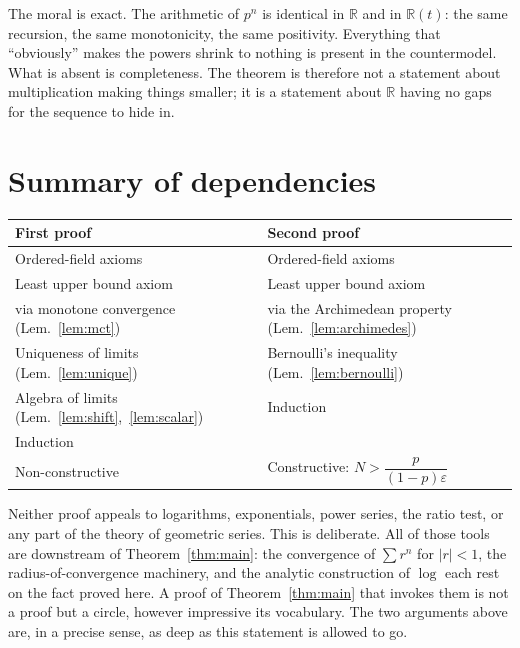 \documentclass{essay}
\begin{document}
The moral is exact. The arithmetic of \(p^{n}\) is identical in \(\mathbb{R}\) and in
\(\mathbb{R}(t)\): the same recursion, the same monotonicity, the same positivity.
Everything that ``obviously'' makes the powers shrink to nothing is present in the
countermodel. What is absent is completeness. The theorem is therefore not a
statement about multiplication making things smaller; it is a statement about
\(\mathbb{R}\) having no gaps for the sequence to hide in.

\section{Summary of dependencies}

\begin{center}
  \begin{tabular}{ll}
    \hline
    \textbf{First proof} & \textbf{Second proof} \\
    \hline
    Ordered-field axioms & Ordered-field axioms \\
    Least upper bound axiom & Least upper bound axiom \\
    \quad via monotone convergence (Lem.~\ref{lem:mct})
    & \quad via the Archimedean property (Lem.~\ref{lem:archimedes}) \\
    Uniqueness of limits (Lem.~\ref{lem:unique}) & Bernoulli's inequality
    (Lem.~\ref{lem:bernoulli}) \\
    Algebra of limits (Lem.~\ref{lem:shift},~\ref{lem:scalar}) & Induction \\
    Induction & \\
    \hline
    Non-constructive & Constructive: \(N > \dfrac{p}{(1-p)\varepsilon}\) \\
    \hline
  \end{tabular}
\end{center}

\medskip

\noindent
Neither proof appeals to logarithms, exponentials, power series, the ratio test, or
any part of the theory of geometric series. This is deliberate. All of those tools
are downstream of Theorem~\ref{thm:main}: the convergence of \(\sum r^{n}\) for
\(|r| < 1\), the radius-of-convergence machinery, and the analytic construction of
\(\log\) each rest on the fact proved here. A proof of Theorem~\ref{thm:main} that
invokes them is not a proof but a circle, however impressive its vocabulary. The two
arguments above are, in a precise sense, as deep as this statement is allowed to go.
\end{document}

